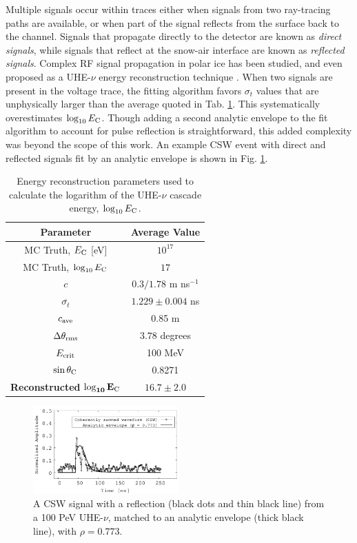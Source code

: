 \documentclass[amsmath,amssymb,aps,prd,10pt,twocolumn,showkeys]{revtex4}
\begin{document}
Multiple signals occur within traces either when signals from two ray-tracing paths are available, or when part of the signal reflects from the surface back to the channel.  Signals that propagate directly to the detector are known as \textit{direct signals}, while signals that reflect at the snow-air interface are known as \textit{reflected signals}.  Complex RF signal propagation in polar ice has been studied, and even proposed as a UHE-$\nu$ energy reconstruction technique \cite{Barwick:2018497,anker2019neutrino-734,deaconu2018measurements-182}.  When two signals are present in the voltage trace, the fitting algorithm favors $\sigma_t$ values that are unphysically larger than the average quoted in Tab. \ref{tab:2}.  This systematically overestimates $\log_{10} E_{\rm C}$.  Though adding a second analytic envelope to the fit algorithm to account for pulse reflection is straightforward, this added complexity was beyond the scope of this work.  An example CSW event with direct and reflected signals fit by an analytic envelope is shown in Fig. \ref{fig:example_waveforms_2}.

\begin{table}[hb]
\centering
\begin{tabular}{| c | c |}
\hline
\textbf{Parameter} & \textbf{Average Value} \\ \hline
MC Truth, $E_{\rm C}$ [eV] & $10^{17}$ \\
MC Truth, $\log_{10}E_{\rm C}$ & $17$ \\
$c$ & $0.3/1.78$ m ns$^{-1}$ \\
$\overline{\sigma_t}$ & $1.229 \pm 0.004$ ns \\
$c_{\rm ave}$ & 0.85 m \\
$\Delta\theta_{\rm rms}$ & $3.78$ degrees \\
$E_{\rm crit}$ & 100 MeV \\
$\sin\theta_{\rm C}$ & 0.8271 \\ \hline
\textbf{Reconstructed} $\mathbf{\log_{10}E_{\rm C}}$ & $16.7\pm 2.0$ \\
\hline
\end{tabular}
\caption{\label{tab:2} Energy reconstruction parameters used to calculate the logarithm of the UHE-$\nu$ cascade energy, $\log_{10}E_{\rm C}$.}
\end{table}

\begin{figure}
\centering
\includegraphics[width=0.5\textwidth]{Sept25_plot2.pdf}
\caption{\label{fig:example_waveforms_2} A CSW signal with a reflection (black dots and thin black line) from a 100 PeV UHE-$\nu$, matched to an analytic envelope (thick black line), with $\rho = 0.773$.}
\end{figure}
\end{document}
